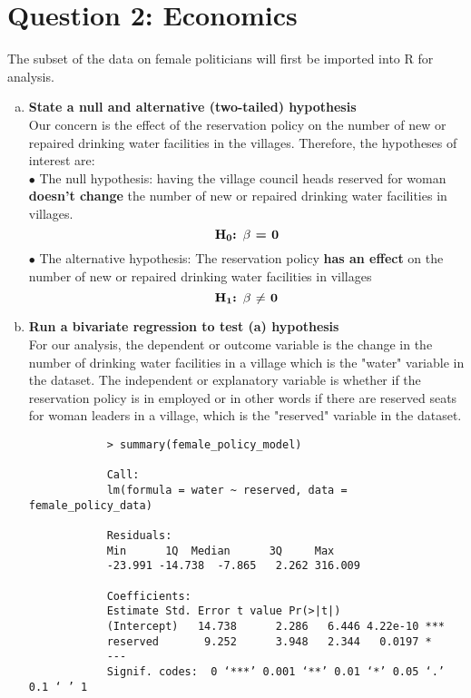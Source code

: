 \documentclass[12pt,letterpaper]{article}
\begin{document}
	\section*{Question 2: Economics}
	\noindent The subset of the data on female politicians will first be imported into R for analysis.
		
	\begin{enumerate} [(a)]
	\item \textbf{State a null and alternative (two-tailed) hypothesis} \\
	Our concern is the effect of the reservation policy on the number of new or repaired drinking water facilities in the villages. Therefore, the hypotheses of interest are: \\
	$\bullet$ The null hypothesis: having the village council heads reserved for woman \textbf{doesn't change} the number of new or repaired drinking water facilities in villages.
		$${\textbf{H\textsubscript{0}: $\beta$ = 0}}$$
	$\bullet$ The alternative hypothesis: The reservation policy \textbf{has an effect} on  the number of new or repaired drinking water facilities in villages
		$${\textbf{H\textsubscript{1}: $\beta$ $\neq$ 0}}$$
		
	\item \textbf{Run a bivariate regression to test (a) hypothesis} \\
	For our analysis, the dependent or outcome variable is the change in the number of drinking water facilities in a village which is the "water" variable in the dataset. The independent or explanatory variable is whether if the reservation policy is in employed or in other words if there are reserved seats for woman leaders in a village, which is the "reserved" variable in the dataset. \\
		
		\begin{verbatim}
			> summary(female_policy_model)
			
			Call:
			lm(formula = water ~ reserved, data = female_policy_data)
			
			Residuals:
			Min      1Q  Median      3Q     Max 
			-23.991 -14.738  -7.865   2.262 316.009 
			
			Coefficients:
			Estimate Std. Error t value Pr(>|t|)    
			(Intercept)   14.738      2.286   6.446 4.22e-10 ***
			reserved       9.252      3.948   2.344   0.0197 *  
			---
			Signif. codes:  0 ‘***’ 0.001 ‘**’ 0.01 ‘*’ 0.05 ‘.’ 0.1 ‘ ’ 1
			

\end{verbatim}
\end{enumerate}
\end{document}
